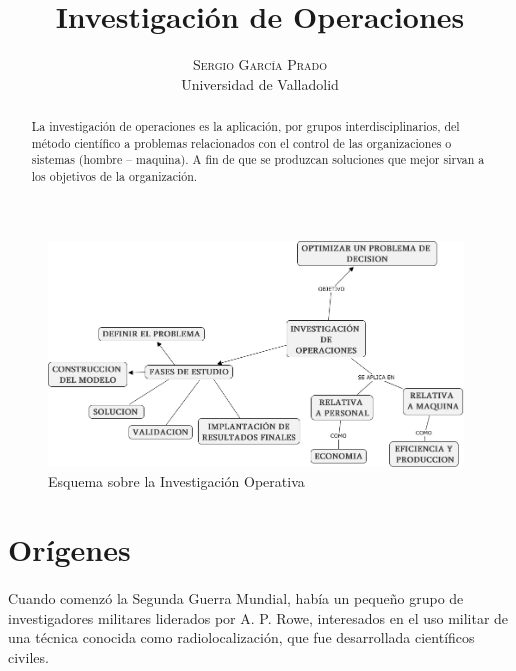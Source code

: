 \documentclass[12pt, a4paper,spanish]{article}
\title{\vspace{-15mm}\fontsize{24pt}{10pt}\selectfont\textbf{Investigación de Operaciones}} %
\author{
\large
\textsc{Sergio García Prado}\\[2mm] %
\normalsize Universidad de Valladolid \\ %
\vspace{-5mm}
}
\date{}
\begin{document}
	\maketitle %

	\thispagestyle{fancy} %


	\begin{abstract}
		\noindent La investigación de operaciones es la aplicación, por grupos interdisciplinarios, del método científico  a problemas relacionados con el control de las organizaciones o sistemas (hombre – maquina). A fin de que se produzcan soluciones que mejor sirvan a los objetivos de la organización. \cite{churchman_ackoff_Arnoff_io}
	\end{abstract}

	\begin{figure}[H]
		\centering
		\includegraphics[width=110mm]{res/io_scheme.jpeg}
		\caption{Esquema sobre la Investigación Operativa \protect\cite{io_scheme}}
	\end{figure}

	\section{Orígenes}

		\paragraph{}
		Cuando comenzó la Segunda Guerra Mundial, había un pequeño grupo de investigadores militares liderados por A. P. Rowe, interesados en el uso militar de una técnica conocida como radiolocalización, que fue desarrollada científicos civiles.\cite{wikipedia_IO}
\end{document}

